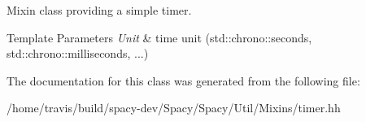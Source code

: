 \-Mixin class providing a simple timer. 


\begin{DoxyTemplParams}{\-Template Parameters}
{\em \-Unit} & time unit (std\-::chrono\-::seconds, std\-::chrono\-::milliseconds, ...) \\
\hline
\end{DoxyTemplParams}


\-The documentation for this class was generated from the following file\-:\begin{DoxyCompactItemize}
\item 
/home/travis/build/spacy-\/dev/\-Spacy/\-Spacy/\-Util/\-Mixins/timer.\-hh\end{DoxyCompactItemize}
